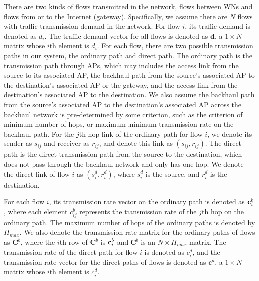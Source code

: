 \documentclass[journal]{IEEEtran}
\begin{document}
There are two kinds of flows transmitted in the network, flows between WNs
and flows from or to the Internet (gateway). Specifically, we assume there are $N$ flows with
traffic transmission demand in the network. For flow $i$, its traffic demand is denoted as $d_i$.
The traffic demand vector for all flows is denoted as $\textbf{d}$, a $1\times N$ matrix whose
$i$th element is $d_i$. For each flow, there are two possible transmission paths in our system, the
ordinary path and direct path. The ordinary path is the transmission path through APs, which may
includes the access link from the source to its associated AP, the backhaul path from the source's
associated AP to the destination's associated AP or the gateway, and the access link from the
destination's associated AP to the destination. We also assume the backhaul path from the source's
associated AP to the destination's associated AP across the backhaul network is pre-determined by
some criterion, such as the criterion of minimum number of hops, or maximum minimum transmission
rate on the backhaul path. For the $j$th hop link of the ordinary path for flow $i$, we denote its
sender as $s_{ij}$ and receiver as $r_{ij}$, and denote this link as $(s_{ij},r_{ij})$. The direct
path is the direct transmission path from the source to the destination, which does not pass
through the backhaul network and only has one hop. We denote the direct link of flow $i$ as
$(s_{i}^d,r_{i}^d)$, where $s_{i}^d$ is the source, and $r_{i}^d$ is the destination.




For each flow $i$, its transmission rate vector on the ordinary path
is denoted as ${\bf{c}}_i^b$, where each element $c_{ij}^b$ represents the transmission rate of the
$j$th hop on the ordinary path. The maximum number of hops of the ordinary paths is denoted by
$H_{max}$. We also denote the transmission rate matrix for the ordinary paths of flows as
$\textbf{C}^b$, where the $i$th row of $\textbf{C}^b$ is ${\bf{c}}_i^b$ and $\textbf{C}^b$ is an
$N\times H_{max}$ matrix. The transmission rate of the direct path for flow $i$ is denoted as
$c_{i}^d$, and the transmission rate vector for the direct paths of flows is denoted as
$\textbf{c}^d$, a $1\times N$ matrix whose $i$th element is $c_{i}^d$.
\end{document}
